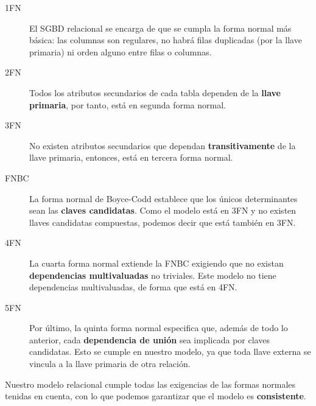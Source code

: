 \begin{description}
	\item[1FN] El \acrshort{SGBD} relacional se encarga de que se cumpla la forma normal más básica: las columnas son regulares, no habrá filas duplicadas (por la llave primaria) ni orden alguno entre filas o columnas. \cite{wiki_1fn}
	\item[2FN] Todos los atributos secundarios de cada tabla dependen de la \textbf{llave primaria}, por tanto, está en segunda forma normal. \cite{wiki_2fn}
	\item[3FN] No existen atributos secundarios que dependan \textbf{transitivamente} de la llave primaria, entonces, está en tercera forma normal. \cite{wiki_3fn}
	\item[FNBC] La forma normal de Boyce-Codd establece que los únicos determinantes sean las \textbf{claves candidatas}. Como el modelo está en 3FN y no existen llaves candidatas compuestas, podemos decir que está también en 3FN. \cite{wiki_fnbc}
	\item[4FN] La cuarta forma normal extiende la FNBC exigiendo que no existan \textbf{dependencias multivaluadas} no triviales. Este modelo no tiene dependencias multivaluadas, de forma que está en 4FN. \cite{wiki_4fn}
	\item[5FN] Por último, la quinta forma normal especifica que, además de todo lo anterior, cada \textbf{dependencia de unión} sea implicada por claves candidatas. Esto se cumple en nuestro modelo, ya que toda llave externa se vincula a la llave primaria de otra relación. \cite{wiki_5fn}
\end{description}

Nuestro modelo relacional cumple todas las exigencias de las formas normales tenidas en cuenta, con lo que podemos garantizar que el modelo es \textbf{consistente}.

\smallskip


